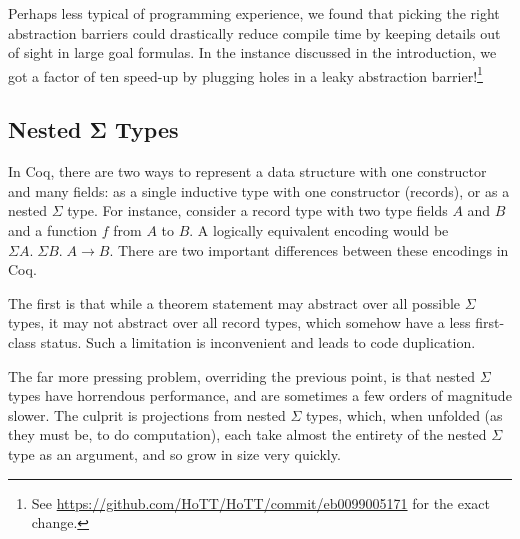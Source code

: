     Perhaps less typical of programming experience, we found that picking the right abstraction barriers could drastically reduce compile time by keeping details out of sight in large goal formulas.
    In the instance discussed in the introduction, we got a factor of ten speed-up by plugging holes in a leaky abstraction barrier!\footnote{See \url{https://github.com/HoTT/HoTT/commit/eb0099005171} for the exact change.}

\subsection{Nested Σ Types} \label{sec:nested-sigma-types}
  In Coq, there are two ways to represent a data structure with one constructor and many fields:
  as a single inductive type with one constructor (records), or as a nested $\Sigma$ type.
  For instance, consider a record type with two type fields $A$ and $B$ and a function $f$ from $A$ to $B$.
  A logically equivalent encoding would be $\Sigma A. \; \Sigma B. \; A \to B$.
  There are two important differences between these encodings in Coq.

  \label{sec:prim-record-proj}
  The first is that while a theorem statement may abstract over all possible $\Sigma$ types, it may not abstract over all record types, which somehow have a less first-class status.
  Such a limitation is inconvenient and leads to code duplication.

  The far more pressing problem, overriding the previous point, is that nested $\Sigma$ types have horrendous performance, and are sometimes a few orders of magnitude slower.
  The culprit is projections from nested $\Sigma$ types, which, when unfolded (as they must be, to do computation), each take almost the entirety of the nested $\Sigma$ type as an argument, and so grow in size very quickly.


